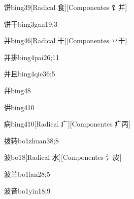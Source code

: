 \begin{verbete}{饼}{bing3}{9}[Radical 食][Componentes ⻠并]
\end{verbete}

\begin{verbete}{饼干}{bing3gan1}{9;3}
\end{verbete}

\begin{verbete}{并}{bing4}{6}[Radical 干][Componentes 丷干]
\end{verbete}

\begin{verbete}{并排}{bing4pai2}{6;11}
\end{verbete}

\begin{verbete}{并且}{bing4qie3}{6;5}
\end{verbete}

\begin{verbete}{幷}{bing4}{8}
\end{verbete}

\begin{verbete}{倂}{bing4}{10}
\end{verbete}

\begin{verbete}{病}{bing4}{10}[Radical 疒][Componentes 疒丙]
\end{verbete}

\begin{verbete}{拨转}{bo1zhuan3}{8;8}
\end{verbete}

\begin{verbete}{波}{bo1}{8}[Radical 水][Componentes ⺡皮]
\end{verbete}

\begin{verbete}{波兰}{bo1lan2}{8;5}
\end{verbete}

\begin{verbete}{波音}{bo1yin1}{8;9}
\end{verbete}

